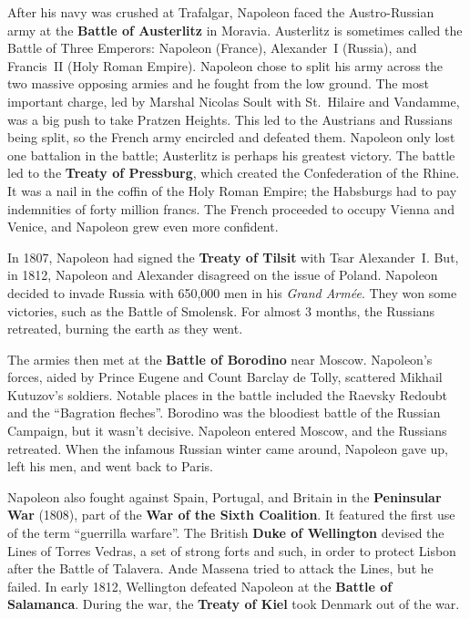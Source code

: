 After his navy was crushed at Trafalgar,
Napoleon faced the Austro-Russian army at the \textbf{Battle of Austerlitz} in Moravia.
Austerlitz is sometimes called the Battle of Three Emperors:
Napoleon (France), Alexander~I (Russia), and Francis~II (Holy Roman Empire).
Napoleon chose to split his army across the two massive opposing armies and he fought from the low ground.
The most important charge, led by Marshal Nicolas Soult with St.\ Hilaire and Vandamme,
was a big push to take Pratzen Heights.
This led to the Austrians and Russians being split, so the French army encircled and defeated them.
Napoleon only lost one battalion in the battle; Austerlitz is perhaps his greatest victory.
The battle led to the \textbf{Treaty of Pressburg}, which created the Confederation of the Rhine.
It was a nail in the coffin of the Holy Roman Empire;
the Habsburgs had to pay indemnities of forty million francs.
The French proceeded to occupy Vienna and Venice, and Napoleon grew even more confident.

In 1807, Napoleon had signed the \textbf{Treaty of Tilsit} with Tsar Alexander~I.
But, in 1812, Napoleon and Alexander disagreed on the issue of Poland.
Napoleon decided to invade Russia with 650,000 men in his \textit{Grand Arm\'ee}.
They won some victories, such as the Battle of Smolensk.
For almost 3 months, the Russians retreated, burning the earth as they went.

The armies then met at the \textbf{Battle of Borodino} near Moscow.
Napoleon's forces, aided by Prince Eugene and Count Barclay de Tolly, scattered Mikhail Kutuzov's soldiers.
Notable places in the battle included the Raevsky Redoubt and the ``Bagration fleches''.
Borodino was the bloodiest battle of the Russian Campaign, but it wasn't decisive.
Napoleon entered Moscow, and the Russians retreated.
When the infamous Russian winter came around, Napoleon gave up, left his men, and went back to Paris.

Napoleon also fought against Spain, Portugal, and Britain in the \textbf{Peninsular War} (1808),
part of the \textbf{War of the Sixth Coalition}.
It featured the first use of the term ``guerrilla warfare''.
The British \textbf{Duke of Wellington} devised the Lines of Torres Vedras, a set of strong forts and such,
in order to protect Lisbon after the Battle of Talavera.
Ande Massena tried to attack the Lines, but he failed.
In early 1812, Wellington defeated Napoleon at the \textbf{Battle of Salamanca}.
During the war, the \textbf{Treaty of Kiel} took Denmark out of the war.

